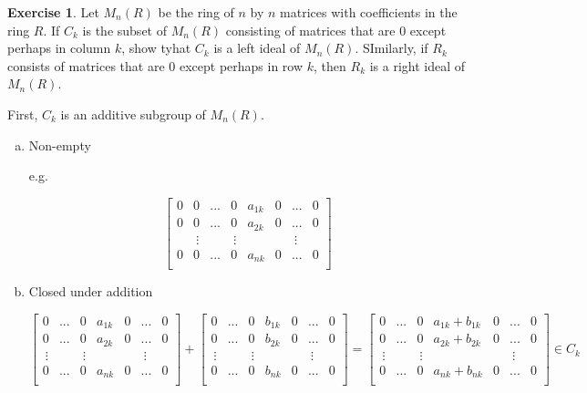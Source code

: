 \documentclass[11pt,oneside]{article}
\numberwithin{equation}{section}
\theoremstyle{definition}
\newtheorem{exercise}{Exercise}
\begin{document}
\begin{exercise}
  Let $M_n(R)$ be the ring of $n$ by $n$ matrices with coefficients
  in the ring $R$. If $C_k$ is the subset of $M_n(R)$ consisting of
  matrices that are $0$ except perhaps in column $k$, show tyhat
  $C_k$ is a left ideal of $M_n(R)$.  SImilarly, if $R_k$ consists
  of matrices that are $0$ except perhaps in row $k$, then $R_k$ is a
  right ideal of $M_n(R)$.  
\end{exercise}
\begin{solution}
  First, $C_k$ is an additive subgroup of $M_n(R)$.
  \begin{enumerate}[(a)]
  \item
    Non-empty

    e.g.
    
    \small
    \[
      \begin{bmatrix}
        0 & 0 & ... & 0 & a_{1k} & 0 & ... & 0 \\
        0 & 0 & ... & 0 & a_{2k} & 0 & ... & 0 \\
        & \ \vdots & & \ \vdots  & & & \ \vdots \\
        0 & 0 & ... & 0 & a_{nk} & 0 & ... & 0 \\
      \end{bmatrix}
    \]
    \normalsize
    
  \item
    Closed under addition

    \small
    \[
      \begin{bmatrix}
        0 & ... & 0 & a_{1k} & 0 & ... & 0 \\
        0 & ... & 0 & a_{2k} & 0 & ... & 0 \\
        \ \vdots & & \ \vdots  & & & \ \vdots \\
        0 & ... & 0 & a_{nk} & 0 & ... & 0 \\
      \end{bmatrix} + \begin{bmatrix}
        0 & ... & 0 & b_{1k} & 0 & ... & 0 \\
        0 & ... & 0 & b_{2k} & 0 & ... & 0 \\
        \ \vdots & & \ \vdots  & & & \ \vdots \\
        0 & ... & 0 & b_{nk} & 0 & ... & 0 \\
      \end{bmatrix} = \begin{bmatrix} 
        0 & ... & 0 & a_{1k} + b_{1k}& 0 & ... & 0 \\
        0 & ... & 0 & a_{2k} + b_{2k}& 0 & ... & 0 \\
        \ \vdots & & \ \vdots  & & & \ \vdots \\
        0 & ... & 0 & a_{nk} + b_{nk}& 0 & ... & 0 \\
      \end{bmatrix} \in C_k
    \]
    \normalsize
    

\end{enumerate}
\end{solution}
\end{document}
